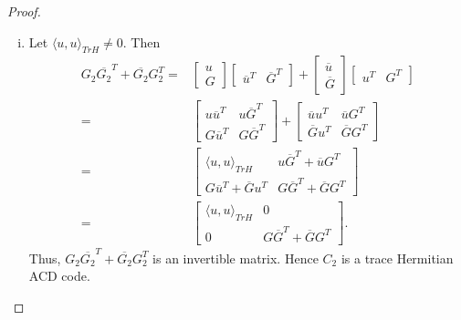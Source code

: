 \documentclass[sn-mathphys-num]{sn-jnl}%
\theoremstyle{thmstyleone}%
\theoremstyle{thmstyletwo}%
\theoremstyle{thmstylethree}%
\begin{document}
\begin{proof}
\begin{enumerate}[(i)]
		Thus, $G_1 \overline{G_1}^T+\overline{G_1}G_1^T$
		is an invertible matrix. Hence $C_1$ is a trace Hermitian ACD code.	
		
		\item Let $\langle u,u\rangle_{TrH}\neq 0.$ Then 
		\begin{align*}
			G_2 \overline{G_2}^T+\overline{G_2}G_2^T=&\begin{bmatrix}
				u\\
				G
			\end{bmatrix}
			\begin{bmatrix}
				\overline{u}^T & \overline{G}^T
			\end{bmatrix}+\begin{bmatrix}
				\overline{u}\\
				\overline{G}
			\end{bmatrix}
			\begin{bmatrix}
				u^T & G^T
			\end{bmatrix}\\
			=&\begin{bmatrix}
				u\overline{u}^T & u\overline{G}^T\\
				G\overline{u}^T & G\overline{G}^T
			\end{bmatrix}+
			\begin{bmatrix}
				\overline{u}u^T &\overline{u}G^T \\
				\overline{G}u^T & \overline{G}G^T
			\end{bmatrix}\\
			=&\begin{bmatrix}
				\langle u,u\rangle_{TrH} & u\overline{G}^T+\overline{u}G^T \\
				G\overline{u}^T+\overline{G}u^T &G\overline{G}^T+ \overline{G}G^T
			\end{bmatrix}\\
			=&\begin{bmatrix}
				\langle u,u\rangle_{TrH} & 0\\
				0 &G\overline{G}^T+ \overline{G}G^T
			\end{bmatrix}.	
		\end{align*}
		Thus, $G_2 \overline{G_2}^T+\overline{G_2}G_2^T$ is an invertible matrix. Hence $C_2$ is a trace Hermitian ACD code.
	\end{enumerate}	
\end{proof}
\end{document}
